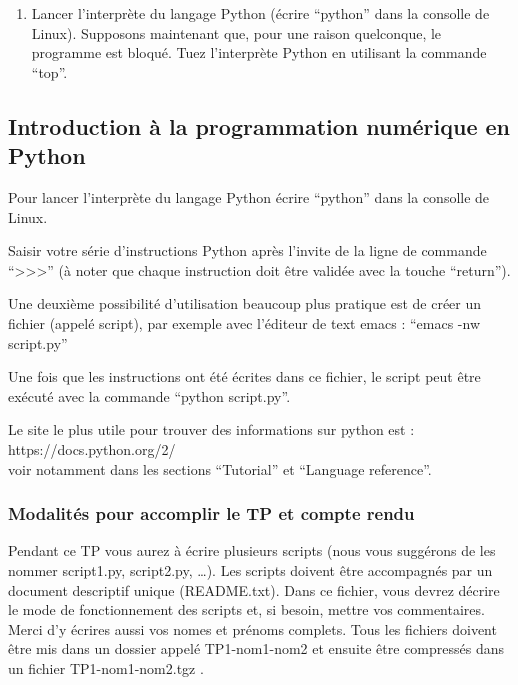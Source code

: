 \documentclass{article}
\begin{document}
    \begin{enumerate}
\def\labelenumi{\arabic{enumi})}
\setcounter{enumi}{6}
\itemsep1pt\parskip0pt
\item
  Lancer l'interprète du langage Python (écrire ``python'' dans la
  consolle de Linux). Supposons maintenant que, pour une raison
  quelconque, le programme est bloqué. Tuez l'interprète Python en
  utilisant la commande ``top''.
\end{enumerate}

    \subsection{Introduction à la programmation numérique en
Python}\label{introduction-uxe0-la-programmation-numuxe9rique-en-python}

    Pour lancer l'interprète du langage Python écrire ``python'' dans la
consolle de Linux.

Saisir votre série d'instructions Python après l'invite de la ligne de
commande ``\textgreater{}\textgreater{}\textgreater{}'' (à noter que
chaque instruction doit être validée avec la touche ``return'').

    Une deuxième possibilité d'utilisation beaucoup plus pratique est de
créer un fichier (appelé script), par exemple avec l'éditeur de text
emacs : ``emacs -nw script.py''

    Une fois que les instructions ont été écrites dans ce fichier, le script
peut être exécuté avec la commande ``python script.py''.

    

    Le site le plus utile pour trouver des informations sur python est :
https://docs.python.org/2/\\voir notamment dans les sections
``Tutorial'' et ``Language reference''.

    

    \subsubsection{Modalités pour accomplir le TP et compte
rendu}\label{modalituxe9s-pour-accomplir-le-tp-et-compte-rendu}

    Pendant ce TP vous aurez à écrire plusieurs scripts (nous vous suggérons
de les nommer script1.py, script2.py, \ldots{}). Les scripts doivent
être accompagnés par un document descriptif unique (README.txt). Dans ce
fichier, vous devrez décrire le mode de fonctionnement des scripts et,
si besoin, mettre vos commentaires. Merci d'y écrires aussi vos nomes et
prénoms complets. Tous les fichiers doivent être mis dans un dossier
appelé TP1-nom1-nom2 et ensuite être compressés dans un fichier
TP1-nom1-nom2.tgz .
\end{document}
